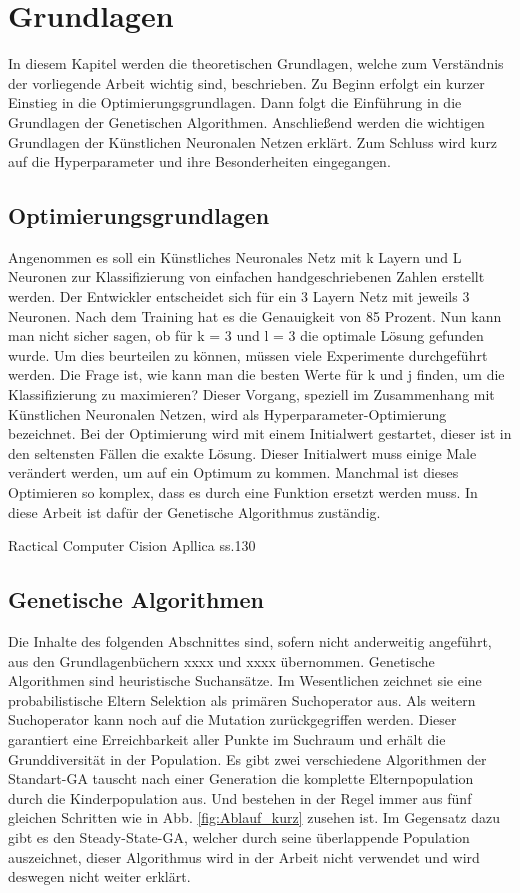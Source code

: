 \section{Grundlagen}
\label{sec:Grundlagen}
In diesem Kapitel werden die theoretischen Grundlagen, welche zum Verständnis der vorliegende Arbeit wichtig sind, beschrieben. Zu Beginn erfolgt ein kurzer Einstieg in die Optimierungsgrundlagen. Dann folgt die Einführung in die Grundlagen der Genetischen Algorithmen. Anschließend werden die wichtigen Grundlagen der Künstlichen Neuronalen Netzen erklärt. Zum Schluss wird kurz auf die Hyperparameter und ihre Besonderheiten eingegangen.

\subsection{Optimierungsgrundlagen}
Angenommen es soll ein Künstliches Neuronales Netz mit k Layern und L Neuronen zur Klassifizierung von einfachen handgeschriebenen Zahlen erstellt werden. Der Entwickler entscheidet sich für ein 3 Layern Netz mit jeweils 3 Neuronen. Nach dem Training hat es die Genauigkeit von 85 Prozent. Nun kann man nicht sicher sagen, ob für k = 3 und l = 3  die optimale Lösung gefunden wurde. Um dies beurteilen zu können, müssen viele Experimente durchgeführt werden. Die Frage ist, wie kann man die besten Werte für k und j finden, um die Klassifizierung zu maximieren? Dieser Vorgang, speziell im Zusammenhang mit Künstlichen Neuronalen Netzen, wird als Hyperparameter-Optimierung bezeichnet. Bei der Optimierung wird mit einem Initialwert gestartet, dieser ist in den seltensten Fällen die exakte Lösung. Dieser Initialwert muss einige Male verändert werden, um auf ein Optimum zu kommen. Manchmal ist dieses Optimieren so komplex, dass es durch eine Funktion ersetzt werden muss. In diese Arbeit ist dafür der Genetische Algorithmus zuständig.

Ractical Computer Cision Apllica ss.130

\subsection{Genetische Algorithmen}

Die Inhalte des folgenden Abschnittes sind, sofern nicht anderweitig angeführt, aus den Grundlagenbüchern xxxx und xxxx übernommen. 
Genetische Algorithmen sind heuristische Suchansätze. Im Wesentlichen zeichnet sie eine probabilistische Eltern Selektion als primären Suchoperator aus. Als weitern Suchoperator kann noch auf die Mutation zurückgegriffen werden. Dieser garantiert eine Erreichbarkeit aller Punkte im Suchraum und erhält die Grunddiversität in der Population. Es gibt zwei verschiedene Algorithmen der Standart-GA tauscht nach einer Generation die komplette Elternpopulation durch die Kinderpopulation aus. Und bestehen in der Regel immer aus fünf gleichen Schritten wie in Abb. \ref{fig:Ablauf_kurz} zusehen ist. Im Gegensatz dazu gibt es den Steady-State-GA, welcher durch seine überlappende Population auszeichnet, dieser Algorithmus wird in der Arbeit nicht verwendet und wird deswegen nicht weiter erklärt.

